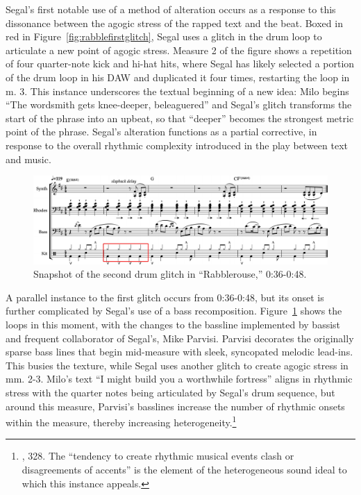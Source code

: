 Segal's first notable use of a method of alteration occurs as a response to this dissonance between the agogic stress of the rapped text and the beat. Boxed in red in Figure~\ref{fig:rabblefirstglitch}, Segal uses a glitch in the drum loop to articulate a new point of agogic stress. Measure 2 of the figure shows a repetition of four quarter-note kick and hi-hat hits, where Segal has likely selected a portion of the drum loop in his DAW and duplicated it four times, restarting the loop in m. 3. This instance underscores the textual beginning of a new idea: Milo begins ``The wordsmith gets knee-deeper, beleaguered'' and Segal's glitch transforms the start of the phrase into an upbeat, so that ``deeper'' becomes the strongest metric point of the phrase. Segal's alteration functions as a partial corrective, in response to the overall rhythmic complexity introduced in the play between text and music.

    \begin{figure}[ht]
        \centering
        \includegraphics[width=\textwidth]{images/figures/chp 02/036048rabblesecondglitch.pdf}
        \caption{Snapshot of the second drum glitch in ``Rabblerouse,'' 0:36-0:48.}
        \label{fig:rabblesecondglitch}
    \end{figure}

A parallel instance to the first glitch occurs from 0:36-0:48, but its onset is further complicated by Segal's use of a bass recomposition. Figure~\ref{fig:rabblesecondglitch} shows the loops in this moment, with the changes to the bassline implemented by bassist and frequent collaborator of Segal's, Mike Parvisi. Parvisi decorates the originally sparse bass lines that begin mid-measure with sleek, syncopated melodic lead-ins. This busies the texture, while Segal uses another glitch to create agogic stress in mm. 2-3. Milo's text \textemdash  ``I might build you a worthwhile fortress'' \textemdash  aligns in rhythmic stress with the quarter notes being articulated by Segal's drum sequence, but around this measure, Parvisi's basslines increase the number of rhythmic onsets within the measure, thereby increasing heterogeneity.\footnote{\cite{ollywilsonHeterogeneousSoundIdeal1992}, 328. The ``tendency to create rhythmic musical events clash or disagreements of accents'' is the element of the heterogeneous sound ideal to which this instance appeals.}

